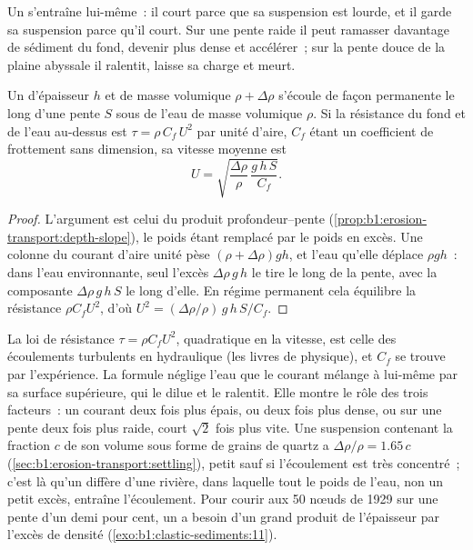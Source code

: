 Un  s'entraîne lui-même~: il court parce que sa suspension est lourde, et
il garde sa suspension parce qu'il court. Sur une pente raide il peut ramasser davantage de
sédiment du fond, devenir plus dense et accélérer~; sur la pente douce de la
plaine abyssale il ralentit, laisse sa charge et meurt.

\begin{proposition}\label{prop:b1:clastic-sediments:turbidity}
Un  d'épaisseur $h$ et de masse volumique $\rho + \Delta\rho$ s'écoule
de façon permanente le long d'une pente $S$ sous de l'eau de masse volumique $\rho$. Si la résistance
du fond et de l'eau au-dessus est $\tau = \rho\,C_f\,U^2$ par unité d'aire, $C_f$
étant un coefficient de frottement sans dimension, sa vitesse moyenne est
\[
  U = \sqrt{\frac{\Delta\rho}{\rho}\,\frac{g\,h\,S}{C_f}} .
\]
\end{proposition}

\begin{proof}
L'argument est celui du produit profondeur--pente
(\cref{prop:b1:erosion-transport:depth-slope}), le poids étant remplacé par
le poids en excès. Une colonne du courant d'aire unité pèse $(\rho +
\Delta\rho) g h$, et l'eau qu'elle déplace $\rho g h$~: dans l'eau
environnante, seul l'excès $\Delta\rho\,g\,h$ le tire le long de la pente, avec la
composante $\Delta\rho\,g\,h\,S$ le long d'elle. En régime permanent cela équilibre la
résistance $\rho C_f U^2$, d'où $U^2 = (\Delta\rho/\rho)\,g\,h\,S/C_f$.
\end{proof}

La loi de résistance $\tau = \rho C_f U^2$, quadratique en la vitesse, est celle des
écoulements turbulents en hydraulique (les livres de physique), et $C_f$ se trouve par
l'expérience. La formule néglige l'eau que le courant mélange à lui-même
par sa surface supérieure, qui le dilue et le ralentit. Elle montre le rôle
des trois facteurs~: un courant deux fois plus épais, ou deux fois plus dense, ou sur une pente
deux fois plus raide, court $\sqrt 2$ fois plus vite. Une suspension contenant la
fraction $c$ de son volume sous forme de grains de quartz a $\Delta\rho/\rho = 1.65\,c$
(\cref{sec:b1:erosion-transport:settling}), petit sauf si l'écoulement est très
concentré~; c'est là qu'un  diffère d'une rivière, dans laquelle
tout le poids de l'eau, non un petit excès, entraîne l'écoulement. Pour courir aux 50 nœuds de 1929 sur une pente d'un demi pour cent,
un  a besoin d'un grand produit de l'épaisseur par l'excès de densité
(\cref{exo:b1:clastic-sediments:11}).

